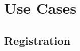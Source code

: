 \pagebreak
\section{Use Cases}

\newenvironment{UseCase}[5]{
	\paragraph{Partecipating actors:} #1
	\paragraph{Entry condition:} #2
	\paragraph{Flow of events:}:
		\begin{itemize} 
			#3 
		\end{itemize}
	\paragraph{Exit condition:} #4
	\paragraph{Exceptions:}
		\begin{itemize}
			#5
		\end{itemize}
	}{}

\newcommand{\Event}[1]{
	\item #1
}

\newcommand{\Exc}[2]{
	\item \textbf{#1:} #2

}


\subsection{Registration}
 
